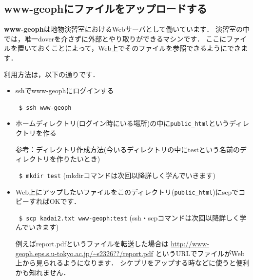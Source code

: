 \documentclass{jarticle}
\begin{document}
\subsection{www-geophにファイルをアップロードする}
{\bf www-geoph}は地物演習室におけるWebサーバとして働いています．
演習室の中では，唯一doverを介さずに外部とやり取りができるマシンです．
ここにファイルを置いておくことによって，Web上でそのファイルを参照できるようにできます．

利用方法は，以下の通りです．
\begin{itemize}
\item sshでwww-geophにログインする

\verb| $ ssh www-geoph| 

\item ホームディレクトリ(ログイン時にいる場所)の中に\verb|public_html|というディレクトリを作る

参考：ディレクトリ作成方法(今いるディレクトリの中にtestという名前のディレクトリを作りたいとき)

\verb| $ mkdir test| (mkdirコマンドは次回以降詳しく学んでいきます)

\item Web上にアップしたいファイルをこのディレクトリ(\verb|public_html|)にscpでコピーすればOKです．

\verb| $ scp kadai2.txt www-geoph:test| (ssh・scpコマンドは次回以降詳しく学んでいきます)

例えばreport.pdfというファイルを転送した場合は
\url{http://www-geoph.eps.s.u-tokyo.ac.jp/~s2326??/report.pdf}
というURLでファイルがWeb上から見られるようになります．
シケプリをアップする時などに使うと便利かも知れません．
\end{itemize}


\vspace{1em}
\end{document}

